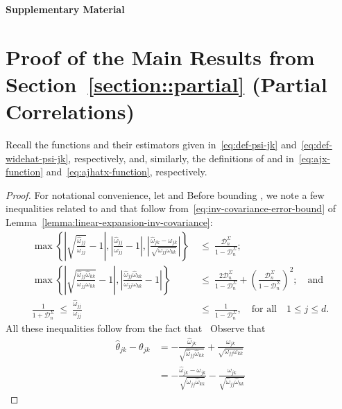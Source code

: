 \documentclass{article}
\begin{document}
\begin{appendices}
\begin{center}{\Large{\bf Supplementary Material}}
\end{center}
\section{Proof of the Main Results from Section~\ref{section::partial} (Partial Correlations)}
\label{appendix:main.partial}
Recall the functions   and their estimators   given in~\eqref{eq:def-psi-jk} and~\eqref{eq:def-widehat-psi-jk}, respectively, and, similarly, the definitions of   and  
in~\eqref{eq:ajx-function} and~\eqref{eq:ajhatx-function}, respectively.
\begin{proof}
For notational convenience, let
  and  
Before bounding  , we note a few inequalities related to   and   that follow from~\eqref{eq:inv-covariance-error-bound} of Lemma~\ref{lemma:linear-expansion-inv-covariance}:
\begin{equation}\label{eq:inequalities-omegas}
\begin{split}
\max\left\{\left|\sqrt{\frac{\widehat{\omega}_{jj}}{\omega_{jj}}} - 1\right|, \left|\frac{\widehat{\omega}_{jj}}{\omega_{jj}} - 1\right|, \left|\frac{\widehat{\omega}_{jk} - \omega_{jk}}{\sqrt{\omega_{jj}\omega_{kk}}}\right|\right\} ~&\le~ \frac{\mathcal{D}_n^{\Sigma}}{1 - \mathcal{D}_n^{\Sigma}};\\ \max\left\{\left|\sqrt{\frac{\widehat{\omega}_{jj}\widehat{\omega}_{kk}}{\omega_{jj}\omega_{kk}}} - 1\right|, \left|\frac{\widehat{\omega}_{jj}\widehat{\omega}_{kk}}{\omega_{jj}\omega_{kk}} - 1\right|\right\} ~&\le~ \frac{2\mathcal{D}_n^{\Sigma}}{1 - \mathcal{D}_n^{\Sigma}} + \left(\frac{\mathcal{D}_n^{\Sigma}}{1 - \mathcal{D}_n^{\Sigma}}\right)^2;\quad\mbox{and}\\ \frac{1}{1 + \mathcal{D}_n^{\Sigma}} ~\le~ \frac{\widehat{\omega}_{jj}}{\omega_{jj}} ~&\le~ \frac{1}{1 - \mathcal{D}_n^{\Sigma}},\quad\mbox{for all}\quad 1\le j\le d.
\end{split}
\end{equation}
All these inequalities follow from the fact that
\ Observe that
\begin{align*}
\widehat{\theta}_{jk} - \theta_{jk} &= -\frac{\widehat{\omega}_{jk}}{\sqrt{\widehat{\omega}_{jj}\widehat{\omega}_{kk}}} + \frac{\omega_{jk}}{\sqrt{\omega_{jj}\omega_{kk}}}\\ &= -\frac{\widehat{\omega}_{jk} - \omega_{jk}}{\sqrt{\widehat{\omega}_{jj}\widehat{\omega}_{kk}}} - \frac{\omega_{jk}}{\sqrt{\widehat{\omega}_{jj}\widehat{\omega}_{kk}}}\left.

\end{align*}
\end{proof}
\end{appendices}
\end{document}

